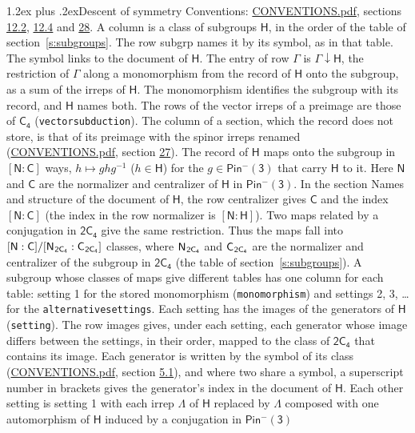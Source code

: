 \documentclass[10pt,a4paper]{article}
\makeatletter
\renewcommand\section{\@startsection{section}{1}{\z@}{-3ex plus -1ex minus -.2ex}%
  {1.2ex plus .2ex}{\normalfont\large\sffamily\bfseries\color{parttitle}}}
\numberwithin{equation}{section}
\newcommand{\grp}[1]{\mathsf{#1}}
\newcommand{\grpindex}[2]{[#1 : #2]}
\newcommand{\restr}[2]{#1\!\downarrow#2}
\newcommand{\hairsp}{\mkern1mu}
\makeatother
\begin{document}
\section{Descent of symmetry}\label{s:subduction}
Conventions: \href{../../CONVENTIONS.pdf}{CONVENTIONS.pdf}, sections \href{../../../rotation/CONVENTIONS.pdf\#conv.12.2}{12.2}, \href{../../../rotation/CONVENTIONS.pdf\#conv.12.4}{12.4} and \href{../../CONVENTIONS.pdf\#conv.28}{28}.
A column is a class of subgroups $\grp{H}$, in the order of the table of section~\ref{s:subgroups}. The row subgrp names it by its symbol, as in that table. The symbol links to the document of $\grp{H}$. The entry of row $\Gamma$ is $\restr{\Gamma}{\grp{H}}$, the restriction of $\Gamma$ along a monomorphism from the record of $\grp{H}$ onto the subgroup, as a sum of the irreps of $\grp{H}$. The monomorphism identifies the subgroup with its record, and $\grp{H}$ names both. The rows of the vector irreps of a preimage are those of \href{../../../rotation/data/pdf/C4.pdf}{$\grp{C_{4}}$} (\texttt{vectorsubduction}). The column of a section, which the record does not store, is that of its preimage with the spinor irreps renamed (\href{../../CONVENTIONS.pdf}{CONVENTIONS.pdf}, section \href{../../CONVENTIONS.pdf\#conv.27}{27}). \label{n:group.normalizer.o3}\label{n:group.centralizer.o3}\label{n:element.h}The record of $\grp{H}$ maps onto the subgroup in $\grpindex{\grp{N}}{\grp{C}}$ ways, $h \mapsto g h g^{-1}$ ($h \in \grp{H}$) for the $g \in \grp{Pin^{-}(3)}$ that carry $\grp{H}$ to it. Here $\grp{N}$ and $\grp{C}$ are the normalizer and centralizer of $\grp{H}$ in \href{Pinminus3.pdf}{$\grp{Pin^{-}(3)}$}. In the section Names and structure of the document of $\grp{H}$, the row centralizer gives $\grp{C}$ and the index $\grpindex{\grp{N}}{\grp{C}}$ (the index in the row normalizer is $\grpindex{\grp{N}}{\grp{H}}$). Two maps related by a conjugation in $\grp{2C_{4}}$ give the same restriction. Thus the maps fall into $\grpindex{\grp{N}}{\grp{C}}/\grpindex{\grp{N}_{\hairsp \grp{2C_{4}}}}{\grp{C}_{\hairsp \grp{2C_{4}}}}$ classes, where $\grp{N}_{\hairsp \grp{2C_{4}}}$ and $\grp{C}_{\hairsp \grp{2C_{4}}}$ are the normalizer and centralizer of the subgroup in $\grp{2C_{4}}$ (the table of section~\ref{s:subgroups}). \label{n:head.setting}A subgroup whose classes of maps give different tables has one column for each table: setting 1 for the stored monomorphism (\texttt{monomorphism}) and settings 2, 3, \dots{} for the \texttt{alternativesettings}. Each setting has the images of the generators of $\grp{H}$ (\texttt{setting}). \label{n:head.images}The row images gives, under each setting, each generator whose image differs between the settings, in their order, mapped to the class of $\grp{2C_{4}}$ that contains its image. Each generator is written by the symbol of its class (\href{../../CONVENTIONS.pdf}{CONVENTIONS.pdf}, section \href{../../../rotation/CONVENTIONS.pdf\#conv.5.1}{5.1}), and where two share a symbol, a superscript number in brackets gives the generator's index in the document of $\grp{H}$. \label{n:irrep.Delta}Each other setting is setting 1 with each irrep $\Lambda$ of $\grp{H}$ replaced by $\Lambda$ composed with one automorphism of $\grp{H}$ induced by a conjugation in \href{Pinminus3.pdf}{$\grp{Pin^{-}(3)}$} 
\end{document}

